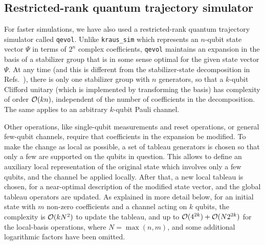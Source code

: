 \subsection{Restricted-rank quantum trajectory simulator}
\label{sec:lfn}

For faster simulations, we have also used a restricted-rank quantum
trajectory simulator called {\tt qevol}.  Unlike {\tt kraus\_sim}
which represents an $n$-qubit state vector $\Psi$ in terms of $2^n$
complex coefficients, {\tt qevol} maintains an expansion in the basis
of a stabilizer group that is in some sense optimal for the given
state vector $\Psi$.  At any time (and this is different from the
stabilizer-state decomposition in
Refs.~), there is
only one stabilizer group with $n$ generators, so that a $k$-qubit
Clifford unitary (which is implemented by transforming the basis) has
complexity of order ${\cal O}(kn)$, independent of the number of
coefficients in the decomposition.  The same applies to an arbitrary
$k$-qubit Pauli channel.

Other operations, like single-qubit measurements and reset
operations, or general few-qubit channels, require that coefficients
in the expansion be modified.  To make the change as local as
possible, a set of tableau generators is chosen so that only a few are
supported on the qubits in question.  This allows to define an
auxiliary local representation of the original state which involves
only a few qubits, and the channel be applied locally.  After that, a
new local tableau is chosen, for a near-optimal description of the
modified state vector, and the global tableau operators are updated.
As explained in more detail below, for an initial state with $m$
non-zero coefficients and a channel acting on $k$ qubits, the
complexity is ${\cal O}(kN^2)$ to update the tableau, and up to
${\cal O}(4^{2k})+{\cal O}(N 2^{2k})$ for the local-basis operations,
where $N=\max(n,m)$, and some additional logarithmic factors have
been omitted.

